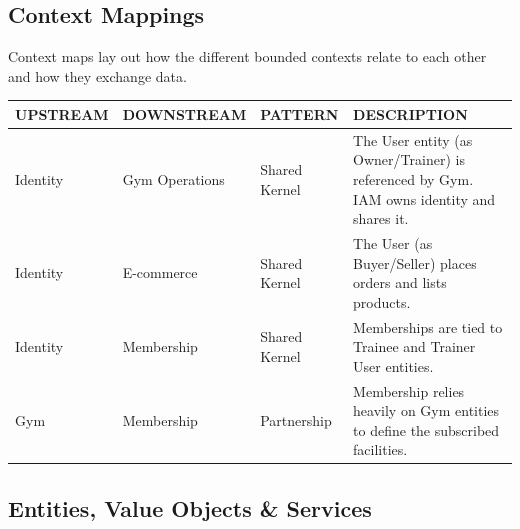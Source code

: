 \documentclass[11pt,a4paper]{article}
\begin{document}
\vspace{1.5em}
\begin{center}
\end{center}

\subsection{Context Mappings}
Context maps lay out how the different bounded contexts relate to each other and how they exchange data.

\vspace{1em}
\noindent
\begin{tabularx}{\textwidth}{l l l X}
\toprule
\textbf{UPSTREAM} & \textbf{DOWNSTREAM} & \textbf{PATTERN} & \textbf{DESCRIPTION} \\
\midrule
Identity & Gym Operations & Shared Kernel & The User entity (as Owner/Trainer) is referenced by Gym. IAM owns identity and shares it. \\
\midrule
Identity & E-commerce & Shared Kernel & The User (as Buyer/Seller) places orders and lists products. \\
\midrule
Identity & Membership & Shared Kernel & Memberships are tied to Trainee and Trainer User entities. \\
\midrule
Gym & Membership & Partnership & Membership relies heavily on Gym entities to define the subscribed facilities. \\
\bottomrule
\end{tabularx}

\subsection{Entities, Value Objects \& Services}
\end{document}
